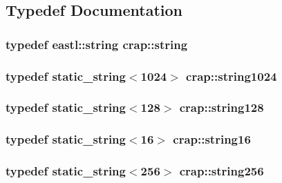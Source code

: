 \subsection{Typedef Documentation}
\hypertarget{namespacecrap_a0fce4d4cb2ab9ac432be9d65ed985e89}{
\subsubsection[{string}]{\setlength{\rightskip}{0pt plus 5cm}typedef eastl\-::string {\bf crap\-::string}}}\label{namespacecrap_a0fce4d4cb2ab9ac432be9d65ed985e89}
\hypertarget{namespacecrap_ae384aff63badcde7befe41d0b09ad95a}{
\subsubsection[{string1024}]{\setlength{\rightskip}{0pt plus 5cm}typedef {\bf static\-\_\-string}$<$1024$>$ {\bf crap\-::string1024}}}\label{namespacecrap_ae384aff63badcde7befe41d0b09ad95a}
\hypertarget{namespacecrap_a7cb51c6f3af6edffb8c3bf40c6f44171}{
\subsubsection[{string128}]{\setlength{\rightskip}{0pt plus 5cm}typedef {\bf static\-\_\-string}$<$128$>$ {\bf crap\-::string128}}}\label{namespacecrap_a7cb51c6f3af6edffb8c3bf40c6f44171}
\hypertarget{namespacecrap_a8dc1eae8e96102b47b5713e982ddc7b6}{
\subsubsection[{string16}]{\setlength{\rightskip}{0pt plus 5cm}typedef {\bf static\-\_\-string}$<$16$>$ {\bf crap\-::string16}}}\label{namespacecrap_a8dc1eae8e96102b47b5713e982ddc7b6}
\hypertarget{namespacecrap_a3bce61c9c06c1edabf6ed73d0b7eaa84}{
\subsubsection[{string256}]{\setlength{\rightskip}{0pt plus 5cm}typedef {\bf static\-\_\-string}$<$256$>$ {\bf crap\-::string256}}}\label{namespacecrap_a3bce61c9c06c1edabf6ed73d0b7eaa84}
